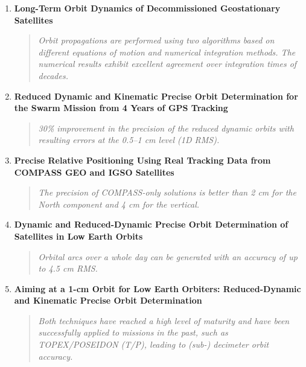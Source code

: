 \begin{enumerate}[label=\textbf{\arabic{enumi}.}, leftmargin=0.5in]
\item \textbf{Long-Term Orbit Dynamics of Decommissioned Geostationary Satellites} \cite{PROIETTI2021559}
\begin{quote}
    \textit{Orbit propagations are performed using two algorithms based on different equations of motion and numerical integration methods. The numerical results exhibit excellent agreement over integration times of decades.}
\end{quote}
    
\item \textbf{Reduced Dynamic and Kinematic Precise Orbit Determination for the Swarm Mission from 4 Years of GPS Tracking} \cite{montenbruck2018reduced}
\begin{quote}
    \textit{30\% improvement in the precision of the reduced dynamic orbits with resulting errors at the 0.5--1 cm level (1D RMS).}
\end{quote}

\item \textbf{Precise Relative Positioning Using Real Tracking Data from COMPASS GEO and IGSO Satellites} \cite{shi2013precise}
\begin{quote}
    \textit{The precision of COMPASS-only solutions is better than 2 cm for the North component and 4 cm for the vertical.}
\end{quote}

\item \textbf{Dynamic and Reduced-Dynamic Precise Orbit Determination of Satellites in Low Earth Orbits} \cite{swatschina2012dynamic}
\begin{quote}
    \textit{Orbital arcs over a whole day can be generated with an accuracy of up to 4.5 cm RMS.}
\end{quote}
    
\item \textbf{Aiming at a 1-cm Orbit for Low Earth Orbiters: Reduced-Dynamic and Kinematic Precise Orbit Determination} \cite{visser2003aiming}
\begin{quote}
    \textit{Both techniques have reached a high level of maturity and have been successfully applied to missions in the past, such as TOPEX/POSEIDON (T/P), leading to (sub-) decimeter orbit accuracy.}
\end{quote}

\end{enumerate}


\endinput  %
